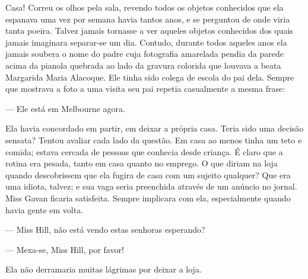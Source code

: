 Casa!  Correu os olhos pela sala, revendo todos os objetos conhecidos que ela
espanava uma vez por semana havia tantos anos, e se perguntou de onde viria
tanta poeira.  Talvez jamais tornasse a ver aqueles objetos conhecidos dos
quais jamais imaginara separar-se um dia.  Contudo, durante todos aqueles anos
ela jamais soubera o nome do padre cuja fotografia amarelada pendia da parede
acima da pianola quebrada ao lado da gravura colorida que louvava a beata
Margarida Maria Alacoque.  Ele tinha sido colega de escola do pai dela.  Sempre
que mostrava a foto a uma visita seu pai repetia casualmente a mesma frase:

--- Ele está em Melbourne agora.

Ela havia concordado em partir, em deixar a própria casa.  Teria sido uma
decisão sensata?  Tentou avaliar cada lado da questão.  Em casa ao menos tinha
um teto e comida; estava cercada de pessoas que conhecia desde criança.  É
claro que a rotina era pesada, tanto em casa quanto no emprego.  O que diriam
na loja quando descobrissem que ela fugira de casa com um sujeito qualquer?
Que era uma idiota, talvez; e sua vaga seria preenchida através de um anúncio
no jornal.  Miss Gavan ficaria satisfeita.  Sempre implicara com ela,
especialmente quando havia gente em volta.

--- Miss Hill, não está vendo estas senhoras esperando?

--- Mexa-se, Miss Hill, por favor!

Ela não derramaria muitas lágrimas por deixar a loja.

